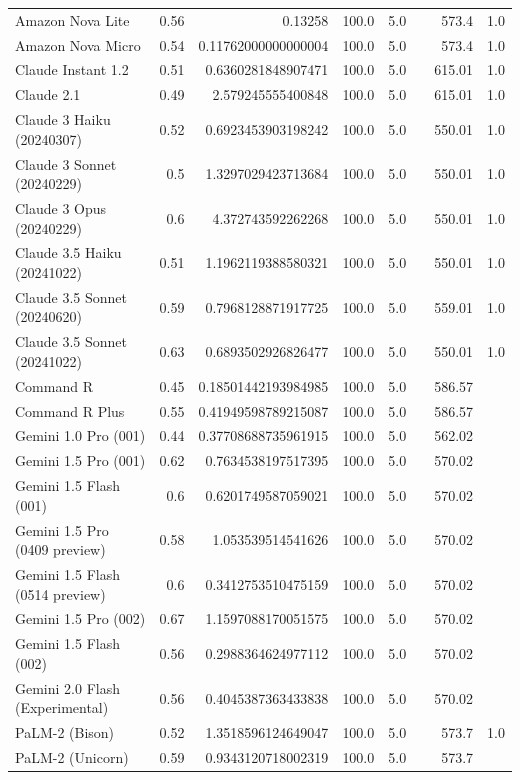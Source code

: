 \begin{table}[htp]
{\begin{tabular}{lrrrrrrr}
Amazon Nova Lite & 0.56 & 0.13258 & 100.0 & 5.0 &  & 573.4 & 1.0 \\
Amazon Nova Micro & 0.54 & 0.11762000000000004 & 100.0 & 5.0 &  & 573.4 & 1.0 \\
Claude Instant 1.2 & 0.51 & 0.6360281848907471 & 100.0 & 5.0 &  & 615.01 & 1.0 \\
Claude 2.1 & 0.49 & 2.579245555400848 & 100.0 & 5.0 &  & 615.01 & 1.0 \\
Claude 3 Haiku (20240307) & 0.52 & 0.6923453903198242 & 100.0 & 5.0 &  & 550.01 & 1.0 \\
Claude 3 Sonnet (20240229) & 0.5 & 1.3297029423713684 & 100.0 & 5.0 &  & 550.01 & 1.0 \\
Claude 3 Opus (20240229) & 0.6 & 4.372743592262268 & 100.0 & 5.0 &  & 550.01 & 1.0 \\
Claude 3.5 Haiku (20241022) & 0.51 & 1.1962119388580321 & 100.0 & 5.0 &  & 550.01 & 1.0 \\
Claude 3.5 Sonnet (20240620) & 0.59 & 0.7968128871917725 & 100.0 & 5.0 &  & 559.01 & 1.0 \\
Claude 3.5 Sonnet (20241022) & 0.63 & 0.6893502926826477 & 100.0 & 5.0 &  & 550.01 & 1.0 \\
Command R & 0.45 & 0.18501442193984985 & 100.0 & 5.0 &  & 586.57 &  \\
Command R Plus & 0.55 & 0.41949598789215087 & 100.0 & 5.0 &  & 586.57 &  \\
Gemini 1.0 Pro (001) & 0.44 & 0.37708688735961915 & 100.0 & 5.0 &  & 562.02 &  \\
Gemini 1.5 Pro (001) & 0.62 & 0.7634538197517395 & 100.0 & 5.0 &  & 570.02 &  \\
Gemini 1.5 Flash (001) & 0.6 & 0.6201749587059021 & 100.0 & 5.0 &  & 570.02 &  \\
Gemini 1.5 Pro (0409 preview) & 0.58 & 1.053539514541626 & 100.0 & 5.0 &  & 570.02 &  \\
Gemini 1.5 Flash (0514 preview) & 0.6 & 0.3412753510475159 & 100.0 & 5.0 &  & 570.02 &  \\
Gemini 1.5 Pro (002) & 0.67 & 1.1597088170051575 & 100.0 & 5.0 &  & 570.02 &  \\
Gemini 1.5 Flash (002) & 0.56 & 0.2988364624977112 & 100.0 & 5.0 &  & 570.02 &  \\
Gemini 2.0 Flash (Experimental) & 0.56 & 0.4045387363433838 & 100.0 & 5.0 &  & 570.02 &  \\
PaLM-2 (Bison) & 0.52 & 1.3518596124649047 & 100.0 & 5.0 &  & 573.7 & 1.0 \\
PaLM-2 (Unicorn) & 0.59 & 0.9343120718002319 & 100.0 & 5.0 &  & 573.7 &  \\

\end{tabular}}
\end{table}
